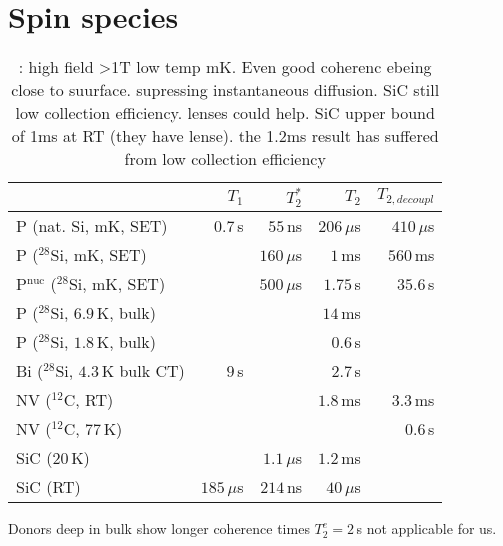 
\section{Spin species}


\begin{table}
\begin{tabular}{lrrrr}
	& $T_1$ & $T_2^{*}$ & $T_2$ & $T_{2, decoupl}$ \\ \hline
P (nat. Si, mK, SET) \cite{Pla2012}& $0.7\, $s & $55\, $ns  & $206\, \mu$s & $410\, \mu$s  \\
P ($^{28}$Si, mK, SET) \cite{Muhonen2014}&  & $160\, \mu$s  & $1\, $ms & $560\, $ms \\
P$^{\text{nuc}}$ ($^{28}$Si, mK, SET) \cite{Muhonen2014}& & $500\, \mu$s & $1.75\, $s & $35.6\, $s \\
P ($^{28}$Si, $6.9\, $K, bulk) \cite{Morley2010}& &  & $14\, $ms &  \\
P ($^{28}$Si, $1.8\, $K, bulk) \cite{Tyryshkin2011}& &  & $0.6\, $s &  \\
Bi ($^{28}$Si, $4.3\, $K bulk CT) \cite{Wolfowicz2013} & $9\, $s &  & $2.7\, $s &\\
NV ($^{12}$C, RT) \cite{Balasubramanian2009,Bar-Gill2013} & & & $1.8\, $ms & $3.3\, $ms \\
NV ($^{12}$C, $77\, $K) \cite{Bar-Gill2013} & & &  & $0.6\, $s \\
SiC ($20\, $K) \cite{Christle2014} & & $1.1\, \mu$s & $1.2\, $ms &  \\
SiC (RT) \cite{Koehl2011} & $185\, \mu$s & $214\, $ns & $40\, \mu$s &   \\
\hline
\end{tabular} 
\label{lala}
\caption{\cite{Pla2012,Muhonen2014}: high field >1T low temp mK. Even good coherenc ebeing close to suurface. \cite{Tyryshkin2011} supressing instantaneous diffusion. SiC still low collection efficiency. lenses could help. SiC upper bound of 1ms at RT \cite{Widmann2014} (they have lense). the 1.2ms result has suffered from low collection efficiency}
\end{table}

Donors deep in bulk show longer coherence times $T_2^e=2\, $s \cite{Tyryshkin2011} not applicable for us.

